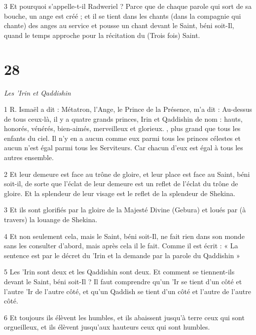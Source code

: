 \par 3 Et pourquoi s'appelle-t-il Radweriel ? Parce que de chaque parole qui sort de sa bouche, un ange est créé ; et il se tient dans les chants (dans la compagnie qui chante) des anges au service et pousse un chant devant le Saint, béni soit-Il, quand le temps approche pour la récitation du (Trois fois) Saint.

\chapter{28}

\par \textit{Les 'Irin et Qaddishin}

\par 1 R. Ismaël a dit : Métatron, l'Ange, le Prince de la Présence, m'a dit : Au-dessus de tous ceux-là, il y a quatre grands princes, Irin et Qaddishin de nom : hauts, honorés, vénérés, bien-aimés, merveilleux et glorieux. , plus grand que tous les enfants du ciel. Il n’y en a aucun comme eux parmi tous les princes célestes et aucun n’est égal parmi tous les Serviteurs. Car chacun d’eux est égal à tous les autres ensemble.

\par 2 Et leur demeure est face au trône de gloire, et leur place est face au Saint, béni soit-il, de sorte que l'éclat de leur demeure est un reflet de l'éclat du trône de gloire. Et la splendeur de leur visage est le reflet de la splendeur de Shekina.

\par 3 Et ils sont glorifiés par la gloire de la Majesté Divine (Gebura) et loués par (à travers) la louange de Shekina.

\par 4 Et non seulement cela, mais le Saint, béni soit-Il, ne fait rien dans son monde sans les consulter d'abord, mais après cela il le fait. Comme il est écrit : « La sentence est par le décret du 'Irin et la demande par la parole du Qaddishin »

\par 5 Les 'Irin sont deux et les Qaddishin sont deux. Et comment se tiennent-ils devant le Saint, béni soit-Il ? Il faut comprendre qu'un 'Ir se tient d'un côté et l'autre 'Ir de l'autre côté, et qu'un Qaddish se tient d'un côté et l'autre de l'autre côté.

\par 6 Et toujours ils élèvent les humbles, et ils abaissent jusqu'à terre ceux qui sont orgueilleux, et ils élèvent jusqu'aux hauteurs ceux qui sont humbles.

